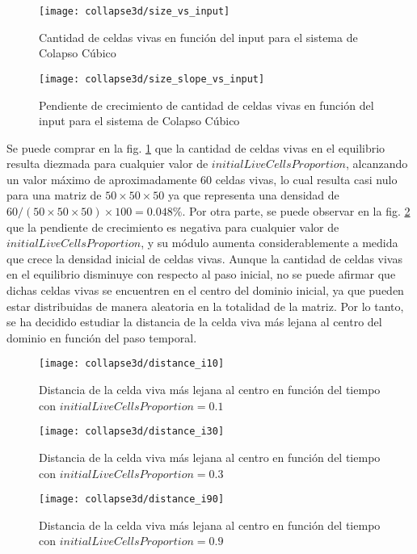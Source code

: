 \begin{figure}[H]
    \centering
    \texttt{[image: collapse3d/size\_vs\_input]}
    \caption{Cantidad de celdas vivas en función del input para el sistema de Colapso Cúbico}
    \label{fig:colapso3d_size_vs_input}
\end{figure}
\begin{figure}[H]
    \centering
    \texttt{[image: collapse3d/size\_slope\_vs\_input]}
    \caption{Pendiente de crecimiento de cantidad de celdas vivas en función del input para el sistema de Colapso Cúbico}
    \label{fig:colapso3d_size_slope_vs_input}
\end{figure}

Se puede comprar en la fig. \ref{fig:colapso3d_size_vs_input} que la cantidad de celdas vivas en el equilibrio
resulta diezmada para cualquier valor de $initialLiveCellsProportion$, alcanzando un valor máximo de aproximadamente
60 celdas vivas, lo cual resulta casi nulo para una matriz de $50 \times 50 \times 50$ ya que representa una densidad
de $60/(50 \times 50 \times 50) \times 100 = 0.048\%$.
Por otra parte, se puede observar en la fig. \ref{fig:colapso3d_size_slope_vs_input} que la pendiente de
crecimiento es negativa para cualquier valor de $initialLiveCellsProportion$, y su módulo aumenta
considerablemente a medida que crece la densidad inicial de celdas vivas.
Aunque la cantidad de celdas vivas en el equilibrio disminuye con respecto al paso inicial, no se puede afirmar
que dichas celdas vivas se encuentren en el centro del dominio inicial, ya que pueden estar distribuidas de manera
aleatoria en la totalidad de la matriz.
Por lo tanto, se ha decidido estudiar la distancia de la celda viva más lejana al centro del dominio en función del
paso temporal.

\begin{figure}[H]
    \centering
    \texttt{[image: collapse3d/distance\_i10]}
    \caption{Distancia de la celda viva más lejana al centro en función del tiempo con $initialLiveCellsProportion = 0.1$}
    \label{fig:colapso3d_d10}
\end{figure}
\begin{figure}[H]
    \centering
    \texttt{[image: collapse3d/distance\_i30]}
    \caption{Distancia de la celda viva más lejana al centro en función del tiempo con $initialLiveCellsProportion = 0.3$}
    \label{fig:colapso3d_d30}
\end{figure}
\begin{figure}[H]
    \centering
    \texttt{[image: collapse3d/distance\_i90]}
    \caption{Distancia de la celda viva más lejana al centro en función del tiempo con $initialLiveCellsProportion = 0.9$}
    \label{fig:colapso3d_d90}
\end{figure}

